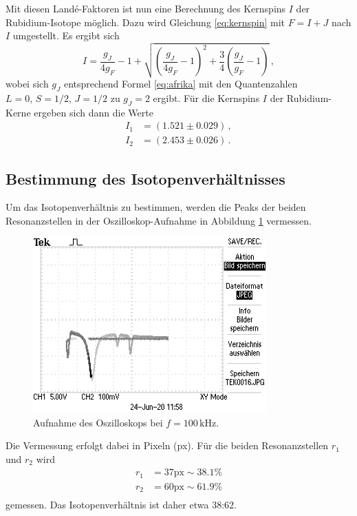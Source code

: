 Mit diesen Landé-Faktoren ist nun eine Berechnung des Kernspins $I$ der Rubidium-Isotope möglich. 
Dazu wird Gleichung \eqref{eq:kernspin} mit $F = I + J$ nach $I$ umgestellt. Es ergibt sich
\begin{equation*}
    I = \frac{g_J}{4 g_F} - 1 + \sqrt{\left(\frac{g_J}{4 g_F} - 1\right)^2 + \frac{3}{4} \left(\frac{g_J}{g_F} - 1\right)} \, , 
\end{equation*}
wobei sich $g_J$ entsprechend Formel \eqref{eq:afrika} mit den Quantenzahlen $L = 0, \, S = 1/2, \, J = 1/2$ zu 
$g_J = 2$ ergibt.
Für die Kernspins $I$ der Rubidium-Kerne ergeben sich dann die Werte
\begin{align*}
    I_1 &= (1.521 \pm 0.029) \, ,\\
    I_2 &= (2.453 \pm 0.026) \, .
\end{align*}

\subsection{Bestimmung des Isotopenverhältnisses}
Um das Isotopenverhältnis zu bestimmen, werden die Peaks der beiden Resonanzstellen in der Oszilloskop-Aufnahme in Abbildung \ref{fig:afig2} vermessen.
\FloatBarrier
\begin{figure}[h]
    \centering
    \includegraphics[width=0.8\textwidth]{TEK0016.JPG}
    \caption{Aufnahme des Oszilloskops bei $f = 100 \, \text{kHz}$.}
    \label{fig:afig2}
\end{figure}
\FloatBarrier
\noindent
Die Vermessung erfolgt dabei in Pixeln (px). Für die beiden Resonanzstellen $r_1$ und $r_2$ wird
\begin{align*}
    r_1 &= 37 \text{px} \sim 38.1 \% \\
    r_2 &= 60 \text{px} \sim 61.9 \% \\
\end{align*}
gemessen. 
Das Isotopenverhältnis ist daher etwa 38:62.

